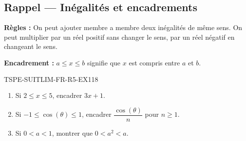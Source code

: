 

\subsection*{Rappel — Inégalités et encadrements}

\textbf{Règles :} On peut ajouter membre a membre deux inégalités de même sens. On peut multiplier par un réel positif sans changer le sens, par un réel négatif en changeant le sens.

\textbf{Encadrement :} $a \leq x \leq b$ signifie que $x$ est compris entre $a$ et $b$.

\begin{exercice}{TSPE-SUITLIM-FR-R5-EX1}{1}{8}
\begin{enumerate}
  \item Si $2 \leq x \leq 5$, encadrer $3x + 1$.
  \item Si $-1 \leq \cos(\theta) \leq 1$, encadrer $\dfrac{\cos(\theta)}{n}$ pour $n \geq 1$.
  \item Si $0 < a < 1$, montrer que $0 < a^2 < a$.
\end{enumerate}
\end{exercice}

